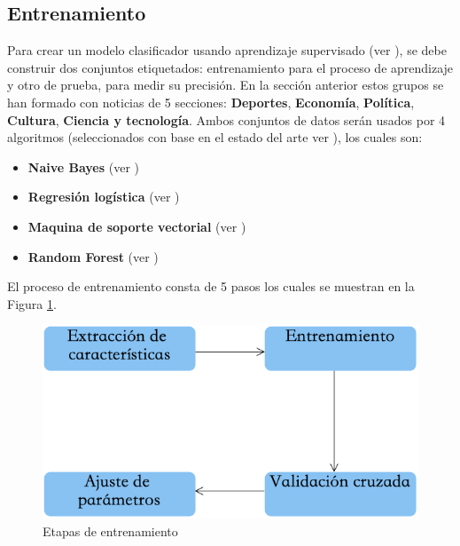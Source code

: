 


\subsection{Entrenamiento}

Para crear un modelo clasificador usando aprendizaje supervisado (ver ), se debe construir dos conjuntos etiquetados: entrenamiento para el proceso de aprendizaje y otro de prueba, para medir su precisión. En la sección anterior estos grupos se han formado con noticias de 5 secciones: \textbf{Deportes}, \textbf{Economía}, \textbf{Política}, \textbf{Cultura}, \textbf{Ciencia y tecnología}. Ambos conjuntos de datos serán usados por 4 algoritmos (seleccionados con base en el estado del arte ver ), los cuales son:

\begin{itemize}
	\item \textbf{Naive Bayes} (ver )
	\item \textbf{Regresión logística} (ver )
	\item \textbf{Maquina de soporte vectorial} (ver )
	\item \textbf{Random Forest} (ver )
\end{itemize}

El proceso de entrenamiento consta de 5 pasos los cuales se muestran en la Figura \ref{fig:cp5:entrenamiento}.

\begin{figure}[h]
\centering
\includegraphics[scale=.55]{imagenes/capitulo5/Entrenamiento/Entrenamiento.png}
\caption{Etapas de entrenamiento}
\label{fig:cp5:entrenamiento}
\end{figure}

